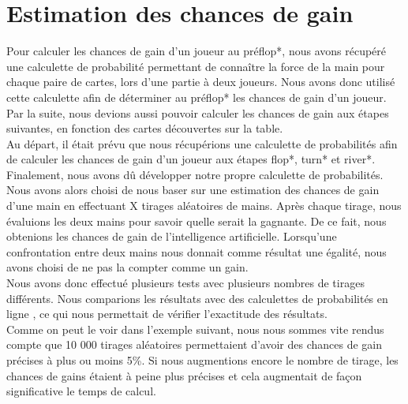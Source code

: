 \documentclass{report}
\begin{document}
\section{Estimation des chances de gain}

\hspace{0.5cm}Pour calculer les chances de gain d'un joueur au préflop*, nous avons récupéré une calculette de probabilité permettant de connaître la force de la main pour chaque paire de cartes, lors d'une partie à deux joueurs. Nous avons donc utilisé cette calculette afin de déterminer au préflop* les chances de gain d'un joueur. Par la suite, nous devions aussi pouvoir calculer les chances de gain aux étapes suivantes, en fonction des cartes découvertes sur la table.\\

Au départ, il était prévu que nous récupérions une calculette de probabilités afin de calculer les chances de gain d'un joueur aux étapes flop*, turn* et river*. Finalement, nous avons dû développer notre propre calculette de probabilités.\\

Nous avons alors choisi de nous baser sur une estimation des chances de gain d'une main en effectuant X tirages aléatoires de mains. Après chaque tirage, nous évaluions les deux mains pour savoir quelle serait la gagnante. De ce fait, nous obtenions les chances de gain de l'intelligence artificielle. Lorsqu'une confrontation entre deux mains nous donnait comme résultat une égalité, nous avons choisi de ne pas la compter comme un gain.\\

Nous avons donc effectué plusieurs tests avec plusieurs nombres de tirages différents. Nous comparions les résultats avec des calculettes de probabilités en ligne \cite{pokernews}, ce qui nous permettait de vérifier l'exactitude des résultats.\\

Comme on peut le voir dans l'exemple suivant, nous nous sommes vite rendus compte que 10 000 tirages aléatoires permettaient d'avoir des chances de gain précises à plus ou moins 5\%. Si nous augmentions encore le nombre de tirage, les chances de gains étaient à peine plus précises et cela augmentait de façon significative le temps de calcul. \\
\end{document}
